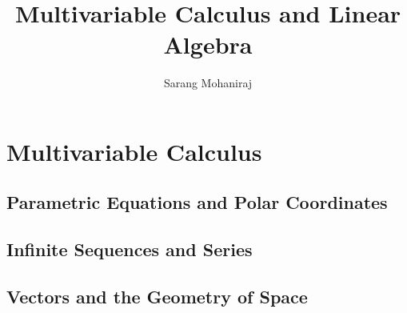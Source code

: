 \title{Multivariable Calculus and Linear Algebra}
\author{Sarang Mohaniraj}

\maketitle
\newpage

\tableofcontents
\newpage


\setcounter{chapter}{10}
\part{Multivariable Calculus}
  \chapter{Parametric Equations and Polar Coordinates}
    
    
    
    
    
    

  \chapter{Infinite Sequences and Series}
    
    
    
    
    
    
    
    
    
    
    
    

  \chapter{Vectors and the Geometry of Space}
    
    
    
    
    
    
    

